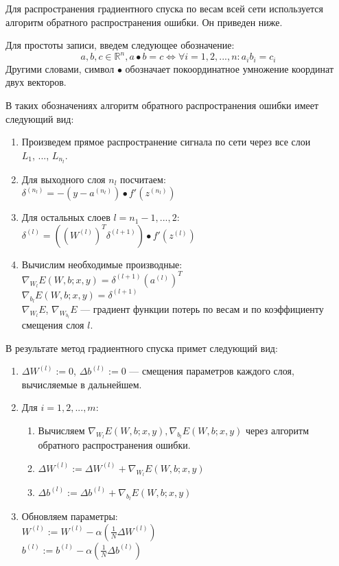 \documentclass[14pt, a4paper]{extarticle}
\begin{document}
Для распространения градиентного спуска по весам всей сети используется алгоритм обратного распространения ошибки. Он приведен ниже.

Для простоты записи, введем следующее обозначение:
\begin{equation*}
	a, b, c\in \mathbb{R}^n, a \bullet b = c \Leftrightarrow \forall i = 1, 2, ..., n: a_i b_i = c_i
\end{equation*}
Другими словами, символ $\bullet$ обозначает покоординатное умножение координат двух векторов.

В таких обозначениях алгоритм обратного распространения ошибки имеет следующий вид:
\begin{enumerate}
	\item Произведем прямое распространение сигнала по сети через все слои \\ $L_1$, ..., $L_{n_l}$.
	\item Для выходного слоя $n_l$ посчитаем: \\ $\delta^{(n_l)} = - (y - a^{(n_l)}) \bullet f'(z^{(n_l)})$
	\item Для остальных слоев $l = n_1-1, ..., 2$: \\ $\delta^{(l)} = ((W^{(l)})^T\delta^{(l+1)}) \bullet f'(z^{(l)})$
	\item Вычислим необходимые производные: \\ $\nabla_{W_{l}} E(W, b; x, y) = \delta^{(l+1)}(a^{(l)})^T$ \\ $\nabla_{b_{l}} E(W, b; x, y) = \delta^{(l+1)}$ \\ $\nabla_{W_{l}}E$, $\nabla_{W_{b_l}}E$ — градиент функции потерь по весам и по коэффициенту смещения слоя $l$.
\end{enumerate}

В результате метод градиентного спуска примет следующий вид:
\begin{enumerate}
	\item $\Delta W^{(l)} := 0$, $\Delta b^{(l)} := 0$ — смещения параметров каждого слоя, вычисляемые в дальнейшем.
	\item Для $i = 1, 2, ..., m$:
	\begin{enumerate}
	\item Вычисляем $\nabla_{W_{l}} E(W, b; x, y), \nabla_{b_{l}} E(W, b; x, y)$ через алгоритм обратного распространения ошибки.
	\item $\Delta W^{(l)} := \Delta W^{(l)} + \nabla_{W_{l}} E(W, b; x, y)$
	\item $\Delta b^{(l)} := \Delta b^{(l)}  + \nabla_{b_{l}} E(W, b; x, y)$
	\end{enumerate}
	\item Обновляем параметры: \\ $W^{(l)} := W^{(l)} - \alpha (\frac{1}{N} \Delta W^{(l)})$ \\ $b^{(l)} := b^{(l)} - \alpha (\frac{1}{N} \Delta b^{(l)})$
\end{enumerate}
\end{document}
